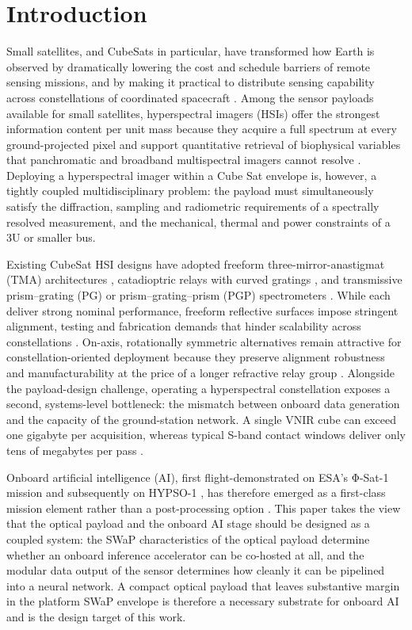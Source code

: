 \documentclass{iac}
\begin{document}
\section{Introduction}
Small satellites, and CubeSats in particular, have transformed how Earth is observed by dramatically lowering the cost and schedule barriers of remote sensing missions, and by making it practical to distribute sensing capability across constellations of coordinated spacecraft \cite{selva2012survey,aragon2021cubesats}. Among the sensor payloads available for small satellites, hyperspectral imagers (HSIs) offer the strongest information content per unit mass because they acquire a full spectrum at every ground-projected pixel and support quantitative retrieval of biophysical variables that panchromatic and broadband multispectral imagers cannot resolve \cite{mouroulis2018review}. Deploying a hyperspectral imager within a Cube Sat envelope is, however, a tightly coupled multidisciplinary problem: the payload must simultaneously satisfy the diffraction, sampling and radiometric requirements of a spectrally resolved measurement, and the mechanical, thermal and power constraints of a 3U or smaller bus.

Existing CubeSat HSI designs have adopted freeform three-mirror-anastigmat (TMA) architectures \cite{liu2021freeform}, catadioptric relays with curved gratings \cite{lee2008optical}, and transmissive prism–grating (PG) or prism–grating–prism (PGP) spectrometers \cite{zhang2023prismgrating,xue2021underwater,yuan2019airborne}. While each deliver strong nominal performance, freeform reflective surfaces impose stringent alignment, testing and fabrication demands that hinder scalability across constellations \cite{mouroulis2018review}. On-axis, rotationally symmetric alternatives remain attractive for constellation-oriented deployment because they preserve alignment robustness and manufacturability at the price of a longer refractive relay group \cite{yuan2019airborne}. Alongside the payload-design challenge, operating a hyperspectral constellation exposes a second, systems-level bottleneck: the mismatch between onboard data generation and the capacity of the ground-station network. A single VNIR cube can exceed one gigabyte per acquisition, whereas typical S-band contact windows deliver only tens of megabytes per pass \cite{cheng2025nanosatellite}. 

Onboard artificial intelligence (AI), first flight-demonstrated on ESA’s Φ-Sat-1 mission \cite{giuffrida2022phisat1} and subsequently on HYPSO-1 \cite{berg2024hypso}, has therefore emerged as a first-class mission element rather than a post-processing option \cite{furano2020edgeai,guerrisi2023compression}. This paper takes the view that the optical payload and the onboard AI stage should be designed as a coupled system: the SWaP characteristics of the optical payload determine whether an onboard inference accelerator can be co-hosted at all, and the modular data output of the sensor determines how cleanly it can be pipelined into a neural network. A compact optical payload that leaves substantive margin in the platform SWaP envelope is therefore a necessary substrate for onboard AI and is the design target of this work.
 
\end{document}

